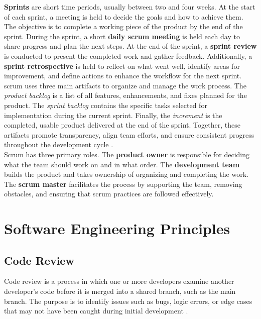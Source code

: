 \textbf{Sprints} are short time periods, usually between two and four weeks. At the start of each sprint, a meeting is held to decide the goals and how to achieve them. The objective is to complete a working piece of the product by the end of the sprint. During the sprint, a short \textbf{daily scrum meeting} is held each day to share progress and plan the next steps. At the end of the sprint, a \textbf{sprint review} is conducted to present the completed work and gather feedback. Additionally, a \textbf{sprint retrospective} is held to reflect on what went well, identify areas for improvement, and define actions to enhance the workflow for the next sprint. \\

\gls{scrum} uses three main artifacts to organize and manage the work process. The \textit{product backlog} is a list of all features, enhancements, and fixes planned for the product. The \textit{sprint backlog} contains the specific tasks selected for implementation during the current sprint. Finally, the \textit{increment} is the completed, usable product delivered at the end of the sprint. Together, these artifacts promote transparency, align team efforts, and ensure consistent progress throughout the development cycle \cite{scrumguides:scrum}. \\

Scrum has three primary roles. The \textbf{product owner} is responsible for deciding what the team should work on and in what order. The \textbf{development team} builds the product and takes ownership of organizing and completing the work. The \textbf{scrum master} facilitates the process by supporting the team, removing obstacles, and ensuring that scrum practices are followed effectively.\\

\section{Software Engineering Principles}
\label{sec:software-engineering-principles}

\subsection{Code Review}
\label{subsec:code-review}

Code review is a process in which one or more developers examine another developer’s code before it is merged into a shared branch, such as the main branch. The purpose is to identify issues such as bugs, logic errors, or edge cases that may not have been caught during initial development \cite{gitlab:code-review}. \\


